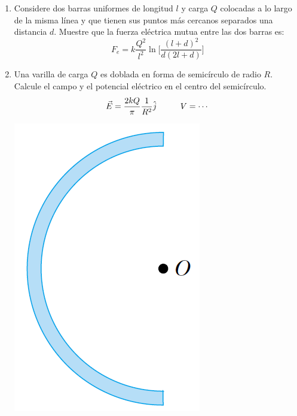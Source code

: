 \documentclass[11pt,twocolumn]{article}
\begin{document}
\begin{enumerate}
\item Considere dos barras uniformes de longitud $l$ y carga $Q$ colocadas a lo largo de la misma línea y que tienen sus puntos más cercanos separados una distancia $d$. Muestre que la fuerza eléctrica mutua entre las dos barras es:
\begin{displaymath}
F_{e}= k\dfrac{Q^2}{l^2} \ln \Big[\dfrac{(l+d)^2}{d(2l+d)}\Big]
\end{displaymath}  

\item Una varilla de carga $Q$ es doblada en forma de semicírculo de radio $R$. Calcule el campo y el potencial eléctrico en el centro del semicírculo.
\begin{displaymath}
\vec{E}=\dfrac{2kQ}{\pi}\dfrac{1}{R^2} \hat{j} \hspace{1.0 cm} V=\cdots
\end{displaymath} 
{
\begin{center}
\includegraphics[scale=0.15]{media-barilla}
\end{center}
}


\end{enumerate}
\end{document}

